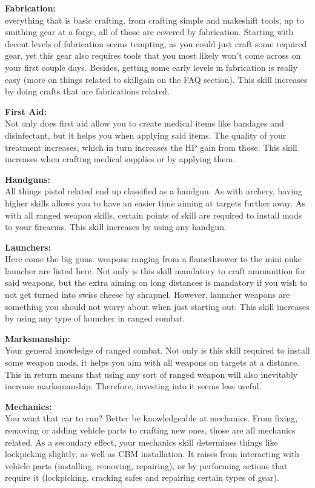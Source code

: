 \textbf{Fabrication:}\\everything that is basic crafting. from crafting simple and makeshift tools, up to smithing gear at a forge, all of those are covered by fabrication. Starting with decent levels of fabrication seems tempting, as you could just craft some required gear, yet this gear also requires tools that you most likely won't come across on your first couple days. Besides, getting some early levels in fabrication is really easy (more on things related to skillgain on the FAQ section). This skill increases by doing crafts that are fabrications related.

\textbf{First Aid:}\\Not only does first aid allow you to create medical items like bandages and disinfectant, but it helps you when applying said items. The quality of your treatment increases, which in turn increases the HP gain from those. This skill increases when crafting medical supplies or by applying them.

\textbf{Handguns:}\\All things pistol related end up classified as a handgun. As with archery, having higher skills allows you to have an easier time aiming at targets further away. As with all ranged weapon skills, certain points of skill are required to install mods to your firearms. This skill increases by using any handgun.

\textbf{Launchers:}\\Here come the big guns. weapons ranging from a flamethrower to the mini nuke launcher are listed here. Not only is this skill mandatory to craft ammunition for said weapons, but the extra aiming on long distances is mandatory if you wish to not get turned into swiss cheese by shrapnel. However, launcher weapons are something you should not worry about when just starting out. This skill increases by using any type of launcher in ranged combat.

\textbf{Marksmanship:}\\Your general knowledge of ranged combat. Not only is this skill required to install some weapon mods, it helps you aim with all weapons on targets at a distance. This in return means that using any sort of ranged weapon will also inevitably increase marksmanship. Therefore, investing into it seems less useful.

\textbf{Mechanics:}\\You want that car to run? Better be knowledgeable at mechanics. From fixing, removing or adding vehicle parts to crafting new ones, those are all mechanics related. As a secondary effect, your mechanics skill determines things like lockpicking slightly, as well as CBM installation. It raises from interacting with vehicle parts (installing, removing, repairing), or by performing actions that require it (lockpicking, cracking safes and repairing certain types of gear).

